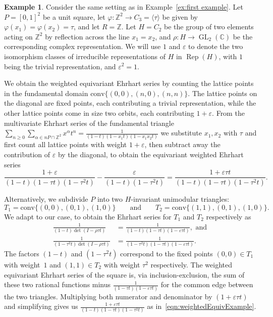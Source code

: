 \documentclass[12pt,reqno]{amsart}
\theoremstyle{definition}
\newtheorem{exam}[thm]{Example}
\theoremstyle{remark}
\newcommand{\conv}{\mathrm{conv}}
\newcommand{\C}{\mathbb{C}}
\newcommand{\Z}{\mathbb{Z}}
\begin{document}
\begin{exam}
    \label{example:equiv}
    Consider the same setting as in Example~\ref{ex:first example}.  Let $P = [0,1]^2$ be a unit square, 
    let $\varphi: \Z^2 \rightarrow C_3 = \langle \tau \rangle$ be given by $\varphi(x_1)=\varphi(x_2)=\tau$, and let $R=\Z$.  Let $H = C_2$ be the group of two elements acting on $\Z^2$ by reflection across the line $x_1=x_2$, and $\rho : H \rightarrow \mathop{GL}_2(\C)$ be the corresponding complex representation.  We will use $1$ and $\varepsilon$ to denote the two isomorphism classes of irreducible representations of $H$ in $\mathop{Rep}(H)$, with $1$ being the trivial representation, and $\varepsilon^2 = 1$.

We obtain the weighted equivariant Ehrhart series by counting the lattice points in the fundamental domain $\conv\{(0,0),(n,0),(n,n)\}$.  The lattice points on the diagonal are fixed points, each contributing a trivial representation, while the other lattice points come in size two orbits, each contributing $1+\varepsilon$.  From the multivariate Ehrhart series of the fundamental triangle
\(
\sum_{n\geq 0}\sum_{\alpha \in nP \cap \Z^2} x^\alpha t^n = \frac{1}{(1-t)(1-x_1 t)(1-x_1 x_2 t)}
\)
we substitute $x_1,x_2$ with $\tau$ and first count all lattice points with weight $1+\varepsilon$, then subtract away the contribution of $\varepsilon$ by the diagonal, to obtain the equivariant weighted Ehrhart series
\begin{equation}
\label{eqn:weightedEquivExample}
\frac{1+\varepsilon}{(1-t)(1-\tau t)(1-\tau^2 t)} - \frac{\varepsilon}{(1-t)(1-\tau^2 t)} = \frac{1+\varepsilon \tau t}{(1-t)(1-\tau t)(1-\tau^2t)}.
\end{equation}

Alternatively, we subdivide $P$ into two $H$-invariant unimodular triangles:
\[
    T_1 = \conv\{(0,0),(0,1),(1,0)\} \qquad \text{and}\qquad 
    T_2  = \conv\{(1,1),(0,1),(1,0)\}.
\]
We adapt \cite[Proposition~6.1]{StapledonEquivariant} to our case, to obtain the Ehrhart series for $T_1$ and $T_2$ respectively as
 \begin{align*}
 \frac{1}{(1-t)\det(I-\rho \tau t)} &= \frac{1}{(1-t)(1-\tau t)(1-\varepsilon \tau t)}, \text{ and } \\
  \frac{1}{(1-\tau^2 t)\det(I-\rho \tau t)} &= \frac{1}{(1-\tau^2t)(1-\tau t)(1-\varepsilon \tau t)}.
 \end{align*}
The factors $(1-t)$ and $(1-\tau^2t)$ correspond  to the fixed points $(0,0) \in T_1$ with weight~$1$ and $(1,1)\in T_2$ with weight $\tau^2$ respectively. The weighted equivariant Ehrhart series of the square is, via inclusion-exclusion,  the sum of these two rational functions minus \(\frac{1}{(1-\tau t)(1-\varepsilon \tau t)}\) for the common edge between the two triangles.
Multiplying both numerator and denominator by $(1+\varepsilon \tau t)$ and simplifying gives us
 \(\frac{1+\varepsilon \tau t}{(1-t)(1-\tau t)(1-\tau^2t)}
\) as in~\eqref{eqn:weightedEquivExample}.
\end{exam}
\end{document}
